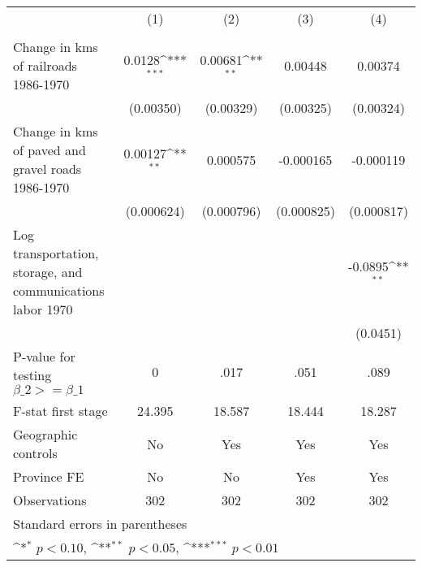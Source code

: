 {
\def\sym#1{\ifmmode^{#1}\else\(^{#1}\)\fi}
\begin{tabular}{l*{4}{c}}
\hline\hline
                &\multicolumn{1}{c}{(1)}&\multicolumn{1}{c}{(2)}&\multicolumn{1}{c}{(3)}&\multicolumn{1}{c}{(4)}\\
                &\multicolumn{1}{c}{}&\multicolumn{1}{c}{}&\multicolumn{1}{c}{}&\multicolumn{1}{c}{}\\
\hline
Change in kms of railroads 1986-1970&   0.0128\sym{***}&  0.00681\sym{**} &  0.00448         &  0.00374         \\
                &(0.00350)         &(0.00329)         &(0.00325)         &(0.00324)         \\
[1em]
Change in kms of paved and gravel roads 1986-1970&  0.00127\sym{**} & 0.000575         &-0.000165         &-0.000119         \\
                &(0.000624)         &(0.000796)         &(0.000825)         &(0.000817)         \\
[1em]
Log transportation, storage, and communications labor 1970&                  &                  &                  &  -0.0895\sym{**} \\
                &                  &                  &                  & (0.0451)         \\
\hline
P-value for testing $\beta\_{2} >= \beta\_{1}$&        0         &     .017         &     .051         &     .089         \\
F-stat first stage&   24.395         &   18.587         &   18.444         &   18.287         \\
Geographic controls&       No         &      Yes         &      Yes         &      Yes         \\
Province FE     &       No         &       No         &      Yes         &      Yes         \\
Observations    &      302         &      302         &      302         &      302         \\
\hline\hline
\multicolumn{5}{l}{\footnotesize Standard errors in parentheses}\\
\multicolumn{5}{l}{\footnotesize \sym{*} \(p<0.10\), \sym{**} \(p<0.05\), \sym{***} \(p<0.01\)}\\
\end{tabular}
}
